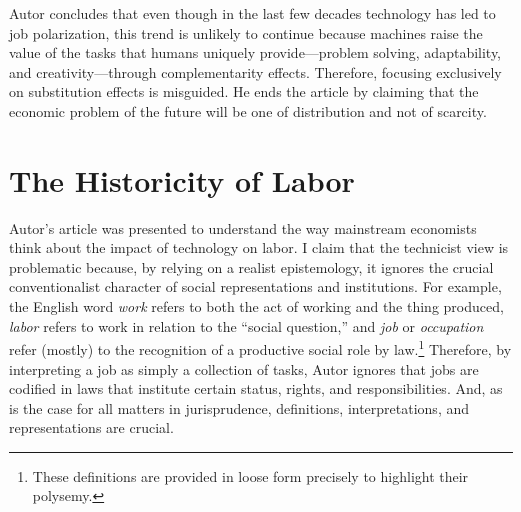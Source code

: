 \documentclass[version=last,draft=false,paper=A4,portrait,twoside=true,twocolumn=false,headinclude=false,footinclude=false,fontsize=12,BCOR=20mm,DIV=calc,pagesize=auto,titlepage=firstiscover,mpinclude=false,open=right,chapterprefix=true,numbers=autoendperiod,headsepline=false,headings=twolinechapter,parskip=false]{scrbook}
\begin{document}
Autor concludes that even though in the last few decades technology has led
to job polarization, this trend is unlikely to continue because machines
raise the value of the tasks that humans uniquely provide---problem
solving, adaptability, and creativity---through complementarity effects.
Therefore, focusing exclusively on substitution effects is misguided. He
ends the article by claiming that the economic problem of the future will
be one of distribution and not of scarcity.


\section{The Historicity of Labor}
\label{sec:org78cfd62}

Autor's article was presented to understand the way mainstream economists
think about the impact of technology on labor. I claim that the technicist
view is problematic because, by relying on a realist epistemology, it
ignores the crucial conventionalist character of social representations and
institutions. For example, the English word \emph{work} refers to both the act of
working and the thing produced, \emph{labor} refers to work in relation to the
``social question,'' and \emph{job} or \emph{occupation} refer (mostly) to the
recognition of a productive social role by law.\footnote{These definitions are provided in loose form precisely to highlight
their polysemy.} Therefore, by
interpreting a job as simply a collection of tasks, Autor ignores that jobs
are codified in laws that institute certain status, rights, and
responsibilities. And, as is the case for all matters in jurisprudence,
definitions, interpretations, and representations are crucial.
\end{document}
